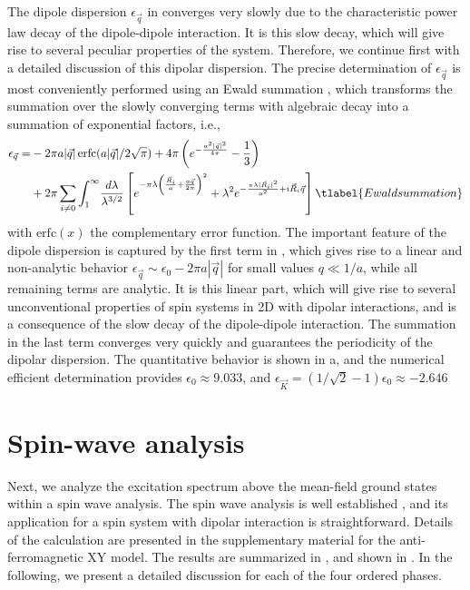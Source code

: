 The dipole dispersion $\epsilon_{\vec q}$ in 
converges very slowly due to the characteristic power law decay of the dipole-dipole
interaction. It is this slow decay, which will give rise to several peculiar
properties of the system. Therefore, we continue first with a detailed discussion
of this dipolar dispersion. The precise determination of $\epsilon_{\vec q}$ is
most conveniently performed using an Ewald summation \cite{Bonsall1977}, which transforms
the summation over the slowly converging terms with algebraic decay into a summation of exponential factors, i.e.,
%
\begin{align}
    \epsilon_{\vec q}   = &- 2 \pi a | {\vec q}|\,{\text{erfc}}(a |{\vec q}|/2\sqrt{\pi})   + 4 \pi \left( e^{- \frac{a^2 |{\vec q}|^2}{4 \pi}} - \frac{1}{3}\right)
\\
   & +     2 \pi \sum_{i\neq 0} \int_{1}^{\infty} \! \frac{d \lambda}{ \lambda^{3/2}} \left[ e^{- \pi  \lambda \left(\frac{ {\vec R}_{i}}{a} + \frac{a {\vec q}}{2 \pi}\right)^2} +\lambda^{2}  e^{- \frac{\pi \lambda |{\vec R}_{i}|^2}{a^2}+ i {\vec R}_{i}{\vec q}}\right]\tlabel{Ewaldsummation}
\end{align}
%
with ${\text{erfc}}(x)$ the complementary error function. The important feature of the dipole
dispersion is captured by the first term in , which
gives rise to a linear and non-analytic behavior $\epsilon_{\vec q} \sim
\epsilon_{0} - 2 \pi a |{\vec q}|$ for small values $q \ll 1/a $, while all
remaining terms are analytic. It is this linear part, which will give rise to
several unconventional properties of spin systems in 2D with dipolar
interactions, and is a consequence of the slow decay of the dipole-dipole
interaction. The summation in the last term converges very quickly and
guarantees the periodicity of the dipolar dispersion. The quantitative behavior
is shown in a, and the numerical efficient determination provides
$\epsilon_{0}\approx 9.033$, and $\epsilon_{\vec K}=(1/\sqrt{2}-1) \epsilon_{0}
\approx -2.646$


\section{Spin-wave analysis}

Next, we analyze the excitation spectrum above the mean-field ground states
within a spin wave analysis. The spin wave analysis is well
established \cite{Kubo1952,Auerbach1994}, and its application for a spin system with dipolar
interaction is straightforward. Details of the calculation are presented in
the supplementary material for the anti-ferromagnetic XY model. The results are
summarized in , and shown in . In the following, we present a detailed
discussion for each of the four ordered phases.




